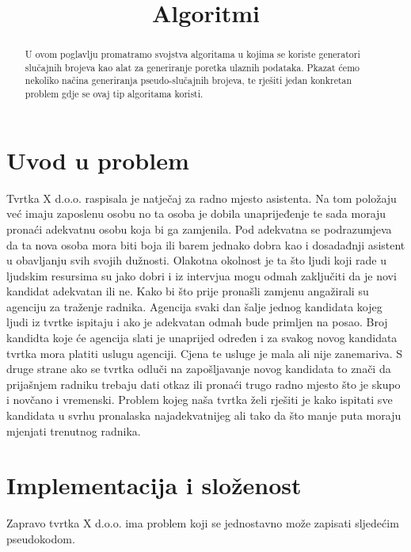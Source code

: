 \documentclass[10pt,a4paper]{article}
\title{Algoritmi}
\begin{document}
\maketitle
\newpage
\begin{abstract}
U ovom poglavlju promatramo svojstva algoritama u kojima se koriste 
generatori slučajnih brojeva kao alat za generiranje poretka ulaznih podataka. 
Pkazat ćemo nekoliko načina generiranja pseudo-slučajnih brojeva, te rješiti jedan 
konkretan problem gdje se ovaj tip algoritama koristi.
\end{abstract}
\section{Uvod u problem}
Tvrtka X d.o.o. raspisala je natječaj za radno mjesto asistenta. Na tom položaju već imaju 
zaposlenu osobu no ta osoba je dobila unaprijeđenje te sada moraju pronaći adekvatnu osobu 
koja bi ga zamjenila. Pod adekvatna se podrazumjeva da ta nova osoba mora biti boja ili barem 
jednako dobra kao i dosadađnji asistent u obavljanju svih svojih dužnosti. Olakotna okolnost je 
ta što ljudi koji rade u ljudskim resursima  su jako dobri i iz intervjua mogu odmah zaključiti 
da je novi kandidat adekvatan ili ne.
Kako bi što prije pronašli zamjenu angažirali su agenciju za traženje radnika. 
Agencija svaki dan šalje jednog kandidata kojeg ljudi iz tvrtke ispitaju i ako je 
adekvatan odmah bude primljen na posao. Broj kandidta koje će agencija slati je unaprijed 
određen i za svakog novog kandidata tvrtka mora platiti uslugu agenciji. Cjena te usluge je
mala ali nije zanemariva. S druge strane ako se tvrtka odluči na zapošljavanje novog kandidata 
to znači da prijašnjem radniku trebaju dati otkaz ili pronaći trugo radno mjesto što je skupo i novčano i vremenski.
Problem kojeg naša tvrtka želi rješiti je kako ispitati sve kandidata u svrhu pronalaska najadekvatnijeg 
ali tako da što manje puta moraju mjenjati trenutnog radnika.\\

\section{Implementacija i složenost} 
Zapravo tvrtka X d.o.o. ima problem koji se jednostavno može zapisati sljedećim pseudokodom.
\end{document}
